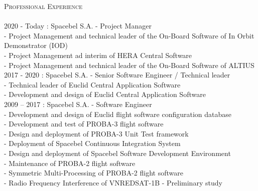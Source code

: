 \documentclass{article}
\newcommand{\lineunder}{\vspace*{-8pt} \\ \hspace*{-18pt} \hrulefill \\}
\newcommand{\header}[1]{{\hspace*{-15pt}\vspace*{6pt} \textsc{#1}} \vspace*{-6pt} \lineunder}
\begin{document}
\newpage
\vspace{0.3cm} \header{Professional Experience}
2020 - Today : Spacebel S.A. - Project Manager \\
\hspace*{0.6cm} - Project Management and technical leader of the On-Board Software of In Orbit Demonstrator (IOD) \\
\hspace*{0.6cm} - Project Management ad interim of HERA Central Software \\
\hspace*{0.6cm} - Project Management and technical leader of the On-Board Software of ALTIUS \\
\vspace{0.3cm}
2017 - 2020 : Spacebel S.A. - Senior Software Engineer / Technical leader \\
\hspace*{0.6cm} - Technical leader of Euclid Central Application Software \\
\hspace*{0.6cm} - Development and design of Euclid Central Application Software \\
\vspace{0.3cm}
2009 -- 2017 : Spacebel S.A. - Software Engineer \\
\hspace*{0.6cm} - Development and design of Euclid flight software configuration database \\
\hspace*{0.6cm} - Development and test of PROBA-3 flight software \\
\hspace*{0.6cm} - Design and deployment of PROBA-3 Unit Test framework \\
\hspace*{0.6cm} - Deployment of Spacebel Continuous Integration System \\
\hspace*{0.6cm} - Design and deployment of Spacebel Software Development Environment \\
\hspace*{0.6cm} - Maintenance of PROBA-2 flight software \\
\hspace*{0.6cm} - Symmetric Multi-Processing of PROBA-2 flight software \\
\hspace*{0.6cm} - Radio Frequency Interference of VNREDSAT-1B - Preliminary study \\
\end{document}
